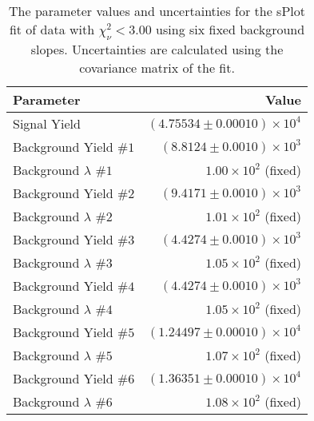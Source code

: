 
\begin{table}[ht]
    \begin{center}
        \begin{tabular}{lr}\toprule
            Parameter & Value \\\midrule
            Signal Yield & $(4.75534 \pm 0.00010) \times 10^{4}$ \\
            Background Yield $\#1$ & $(8.8124 \pm 0.0010) \times 10^{3}$ \\
            Background $\lambda$ $\#1$ & $1.00 \times 10^{2}$ (fixed) \\
            Background Yield $\#2$ & $(9.4171 \pm 0.0010) \times 10^{3}$ \\
            Background $\lambda$ $\#2$ & $1.01 \times 10^{2}$ (fixed) \\
            Background Yield $\#3$ & $(4.4274 \pm 0.0010) \times 10^{3}$ \\
            Background $\lambda$ $\#3$ & $1.05 \times 10^{2}$ (fixed) \\
            Background Yield $\#4$ & $(4.4274 \pm 0.0010) \times 10^{3}$ \\
            Background $\lambda$ $\#4$ & $1.05 \times 10^{2}$ (fixed) \\
            Background Yield $\#5$ & $(1.24497 \pm 0.00010) \times 10^{4}$ \\
            Background $\lambda$ $\#5$ & $1.07 \times 10^{2}$ (fixed) \\
            Background Yield $\#6$ & $(1.36351 \pm 0.00010) \times 10^{4}$ \\
            Background $\lambda$ $\#6$ & $1.08 \times 10^{2}$ (fixed) \\\bottomrule
        \end{tabular}
        \caption{The parameter values and uncertainties for the sPlot fit of data with $\chi^2_\nu < 3.00$ using six fixed background slopes. Uncertainties are calculated using the covariance matrix of the fit.}\label{tab:splot-fit-results-chisqdof-3.00-fixed-6}
    \end{center}
\end{table}
